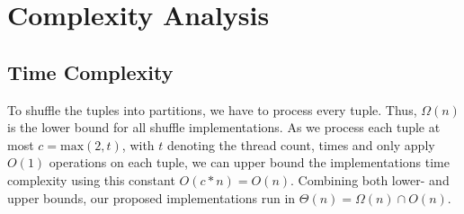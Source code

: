\section{Complexity Analysis}
\subsection{Time Complexity}
To shuffle the tuples into partitions, we have to process every tuple.
Thus, $\Omega(n)$ is the lower bound for all shuffle implementations.
As we process each tuple at most $c = \textrm{max}(2, t)$, with $t$ denoting the thread count, times and only apply $O(1)$ operations on each tuple, we can upper bound the implementations time complexity using this constant $O(c * n) = O(n)$.
Combining both lower- and upper bounds, our proposed implementations run in $\Theta(n) = \Omega(n) \cap O(n) $.
